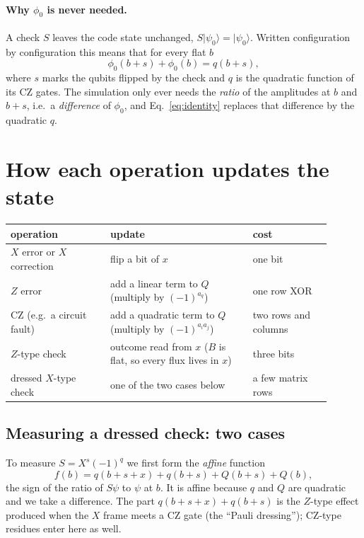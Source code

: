\documentclass[11pt,a4paper]{article}
\providecommand{\ket}[1]{\ensuremath{|#1\rangle}}
\begin{document}
\paragraph{Why $\phi_0$ is never needed.} A check $S$ leaves the code state unchanged, $S\ket{\psi_0}=\ket{\psi_0}$. Written configuration by configuration this means that for every flat $b$
\begin{equation}
\phi_0(b+s)+\phi_0(b)=q(b+s),
\label{eq:identity}
\end{equation}
where $s$ marks the qubits flipped by the check and $q$ is the quadratic function of its CZ gates. The simulation only ever needs the \emph{ratio} of the amplitudes at $b$ and $b+s$, i.e.\ a \emph{difference} of $\phi_0$, and Eq.~\eqref{eq:identity} replaces that difference by the quadratic $q$.

\section{How each operation updates the state}

\begin{center}
\begin{tabular}{>{\raggedright}p{0.28\linewidth}>{\raggedright}p{0.4\linewidth}p{0.22\linewidth}}
\toprule
operation & update & cost \\
\midrule
$X$ error or $X$ correction & flip a bit of $x$ & one bit \\
$Z$ error & add a linear term to $Q$ (multiply by $(-1)^{a_q}$) & one row XOR \\
CZ (e.g.\ a circuit fault) & add a quadratic term to $Q$ (multiply by $(-1)^{a_ia_j}$) & two rows and columns \\
$Z$-type check & outcome read from $x$ ($B$ is flat, so every flux lives in $x$) & three bits \\
dressed $X$-type check & one of the two cases below & a few matrix rows \\
\bottomrule
\end{tabular}
\end{center}

\subsection{Measuring a dressed check: two cases}

To measure $S=X^s(-1)^q$ we first form the \emph{affine} function
\begin{equation}
f(b)=q(b+s+x)+q(b+s)+Q(b+s)+Q(b),
\label{eq:f}
\end{equation}
the sign of the ratio of $S\psi$ to $\psi$ at $b$. It is affine because $q$ and $Q$ are quadratic and we take a difference. The part $q(b+s+x)+q(b+s)$ is the $Z$-type effect produced when the $X$ frame meets a CZ gate (the ``Pauli dressing''); CZ-type residues enter here as well.
\end{document}
